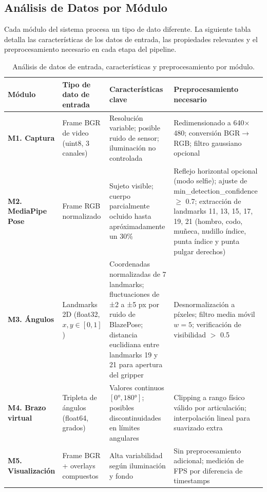 \subsection{Análisis de Datos por Módulo}

Cada módulo del sistema procesa un tipo de dato diferente. La siguiente
tabla detalla las características de los datos de entrada, las propiedades
relevantes y el preprocesamiento necesario en cada etapa del pipeline.

\begin{table}[H]
\centering
\label{tab:datos_modulo}
\renewcommand{\arraystretch}{1.3}
\begin{tabularx}{\textwidth}{
    >{\bfseries}p{2.8cm}
    X
    X
    X
}
\toprule
\textbf{Módulo} &
\textbf{Tipo de dato de entrada} &
\textbf{Características clave} &
\textbf{Preprocesamiento necesario} \\
\midrule
M1. Captura &
  Frame BGR de video (uint8, 3 canales) &
  Resolución variable; posible ruido de sensor; iluminación no controlada &
  Redimensionado a 640$\times$480; conversión BGR$\to$RGB; filtro gaussiano opcional \\
\midrule
M2. MediaPipe Pose &
  Frame RGB normalizado &
  Sujeto visible; cuerpo parcialmente ocluido hasta apróximadamente un 30\% &
  Reflejo horizontal opcional (modo selfie); ajuste de
  min\_detection\_confidence $\geq$ 0.7; extracción de landmarks 11, 13, 15, 17, 19, 21 (hombro, codo, muñeca, nudillo índice, punta índice y punta pulgar derechos) \\
\midrule
M3. Ángulos &
  Landmarks 2D (float32, $x,y \in [0,1]$) &
  Coordenadas normalizadas de 7 landmarks; fluctuaciones de ±2 a ±5 px por ruido de BlazePose; distancia euclidiana entre landmarks 19 y 21 para apertura del gripper &
  Desnormalización a píxeles; filtro media móvil $w = 5$;
  verificación de visibilidad $>$ 0.5 \\
\midrule
M4. Brazo virtual &
  Tripleta de ángulos (float64, grados) &
  Valores continuos $[0°, 180°]$; posibles discontinuidades en límites angulares &
  Clipping a rango físico válido por articulación;
  interpolación lineal para suavizado extra \\
\midrule
M5. Visualización &
  Frame BGR + overlays compuestos &
  Alta variabilidad según iluminación y fondo &
  Sin preprocesamiento adicional; medición de FPS por diferencia de timestamps \\
\bottomrule
\end{tabularx}
\caption{Análisis de datos de entrada, características y preprocesamiento por módulo.}
\end{table}

